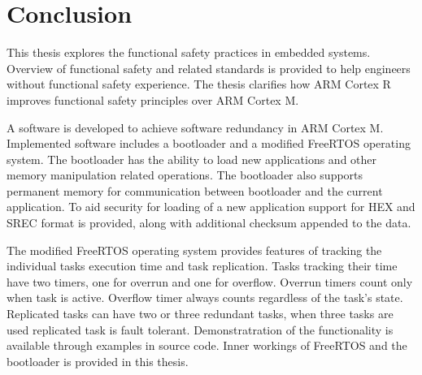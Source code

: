 \chapter{Conclusion}

This thesis explores the functional safety practices in embedded systems. Overview of functional safety and related standards is provided to help engineers without functional safety experience. The thesis clarifies how ARM Cortex R improves functional safety principles over ARM Cortex M. 

A software is developed to achieve software redundancy in ARM Cortex M. Implemented software includes a bootloader and a modified FreeRTOS operating system.  The bootloader has the ability to load new applications and other memory manipulation related operations. The bootloader also supports permanent memory for communication between bootloader and the current application. To aid security for loading of a  new application support for HEX and SREC format is provided, along with additional checksum appended to the data.

The modified FreeRTOS operating system provides features of tracking the individual tasks execution time and task replication. Tasks tracking their time have two timers, one for overrun and one for overflow. Overrun timers count only when task is active. Overflow timer always counts regardless of the task's state. Replicated tasks can have two or three redundant tasks, when three tasks are used replicated task is fault tolerant. Demonstratration of the functionality is available through examples in source code. Inner workings of FreeRTOS and the bootloader is provided in this thesis.